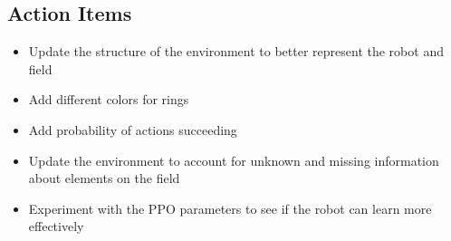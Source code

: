 \subsection{Action Items}
\begin{itemize}
    \item Update the structure of the environment to better represent the robot and field
    \item Add different colors for rings
    \item Add probability of actions succeeding
    \item Update the environment to account for unknown and missing information about elements on the field
    \item Experiment with the PPO parameters to see if the robot can learn more effectively
\end{itemize}